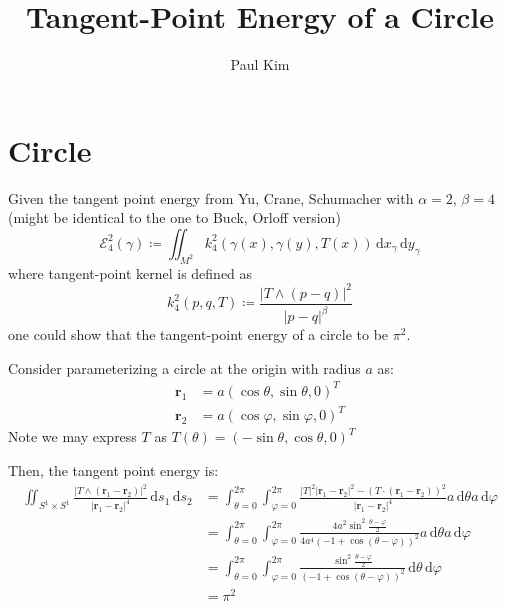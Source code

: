 \documentclass[a4paper]{article}
\title{Tangent-Point Energy of a Circle}
\author{Paul Kim}
\newcommand{\dx}{\, \text{d} x}
\newcommand{\dy}{\, \text{d} y}
\newcommand{\ds}{\, \text{d} s}
\newcommand{\dt}{\, \text{d} \theta}
\newcommand{\dphi}{\, \text{d} \varphi}
\newcommand{\rb}{\mathbf{r}}
\begin{document}
\maketitle

\section{Circle}
Given the tangent point energy from Yu, Crane, Schumacher with $\alpha = 2$, $\beta = 4$
(might be identical to the one to Buck, Orloff version)
\begin{equation}
    \mathcal{E}_{4}^2 \left( \gamma \right) \coloneqq \iint_{M^2} k_{4}^2 \left( \gamma (x), \gamma (y), T(x) \right) \dx_{\gamma} \dy_{\gamma}
    \label{equ: Energy}
\end{equation}
where tangent-point kernel is defined as
\begin{equation}
    k_{4}^2 (p, q, T) \coloneqq \frac{|T \wedge \left( p - q \right)|^2}{|p-q|^\beta}
\end{equation}
one could show that the tangent-point energy of a circle to be $\pi^2$.

Consider parameterizing a circle at the origin with radius $a$ as:
\begin{align}
    \rb_1 &= a \left( \cos \theta, \sin \theta, 0 \right) ^ T \\
    \rb_2 &= a \left( \cos \varphi, \sin \varphi, 0 \right) ^ T
\end{align}
Note we may express $T$ as $T\left( \theta \right) = \left( - \sin \theta, \cos \theta, 0 \right) ^ T$

Then, the tangent point energy is:
\begin{align}
    \iint_{S^1 \times S^1} \frac{|T \wedge \left( \rb_1 - \rb_2 \right)|^2}{|\rb_1 - \rb_2|^4} \ds_1 \ds_2
    &= \int_{\theta = 0}^{2 \pi} \int_{\varphi = 0}^{2 \pi} \frac{|T|^2 |\rb_1 - \rb_2|^2 - \left( T \cdot \left( \rb_1 - \rb_2 \right) \right)^2}{|\rb_1 - \rb_2|^4} a \dt a \dphi \\
    &= \int_{\theta = 0}^{2 \pi} \int_{\varphi = 0}^{2 \pi} \frac{4 a^2 \sin^2 \frac{\theta - \varphi}{2}}{4 a^4 \left( -1 + \cos \left( \theta - \varphi \right) \right)^2} a \dt a \dphi \\
    &= \int_{\theta = 0}^{2 \pi} \int_{\varphi = 0}^{2 \pi} \frac{\sin^2 \frac{\theta - \varphi}{2}}{\left( -1 + \cos \left( \theta - \varphi \right) \right)^2} \dt \dphi \\
    &= \pi^2
\end{align}
\end{document}
